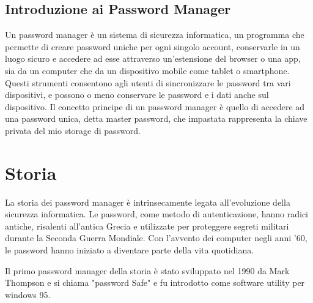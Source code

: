 \documentclass[a4paper,12pt]{report}
\begin{document}
	\subsection*{Introduzione ai Password Manager} 
	Un password manager è un sistema di
	sicurezza informatica, un programma che permette di creare password uniche per
	ogni singolo account, conservarle in un luogo sicuro e accedere ad esse
	attraverso un’estensione del browser o una app, sia da un computer che da un
	dispositivo mobile come tablet o smartphone. Questi strumenti consentono agli
	utenti di sincronizzare le password tra vari dispositivi, e possono o meno
	conservare le password e i dati anche sul dispositivo.
	Il concetto principe di un password manager è quello di accedere
	ad una password unica, detta master password, che impastata
	rappresenta la chiave privata del mio storage di password.

	\section{Storia} 
	La storia dei password manager è intrinsecamente legata all'evoluzione della
	sicurezza informatica. Le password, come metodo di autenticazione, hanno radici
	antiche, risalenti all'antica Grecia e utilizzate per proteggere segreti
	militari durante la Seconda Guerra Mondiale. Con l'avvento dei computer negli
	anni '60, le password hanno iniziato a diventare parte della vita quotidiana.

	Il primo password manager della storia è stato sviluppato nel 1990 da Mark
	Thompson \cite{password-manager-hystory} e si chiama "password Safe" e 
	fu introdotto come software utility per windows 95. 
\end{document}
